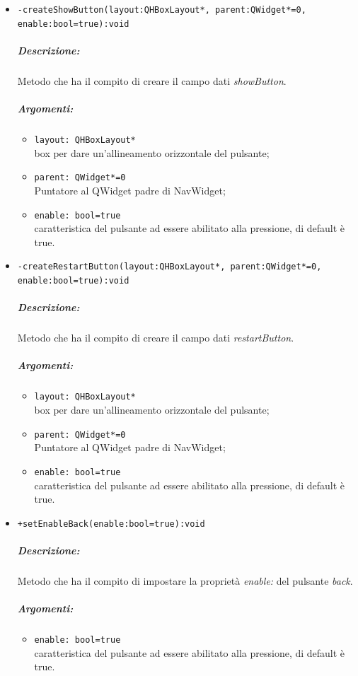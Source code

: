 \begin{itemize}
\item \color{blue}\verb!-createShowButton(layout:QHBoxLayout*, parent:QWidget*=0, enable:bool=true):void!
\color{black}
\subparagraph{Descrizione:} Metodo che ha il compito di creare il campo dati \emph{showButton}.
\subparagraph{Argomenti:}
\begin{itemize}
\item  \color{RoyalPurple} \verb!layout: QHBoxLayout*! \\ box per dare un'allineamento orizzontale del pulsante;
\item  \color{RoyalPurple} \verb!parent: QWidget*=0 ! \\ Puntatore al QWidget padre di NavWidget;
\item  \color{RoyalPurple} \verb!enable: bool=true !\\ caratteristica del pulsante ad essere abilitato alla pressione, di default è true.
\end{itemize}

\item \color{blue}\verb!-createRestartButton(layout:QHBoxLayout*, parent:QWidget*=0, enable:bool=true):void!
\color{black}
\subparagraph{Descrizione:} Metodo che ha il compito di creare il campo dati \emph{restartButton}.
\subparagraph{Argomenti:}
\begin{itemize}
\item  \color{RoyalPurple} \verb!layout: QHBoxLayout*! \\ box per dare un'allineamento orizzontale del pulsante;
\item  \color{RoyalPurple} \verb!parent: QWidget*=0 ! \\ Puntatore al QWidget padre di NavWidget;
\item  \color{RoyalPurple} \verb!enable: bool=true !\\ caratteristica del pulsante ad essere abilitato alla pressione, di default è true.
\end{itemize}

\item \color{blue}\verb!+setEnableBack(enable:bool=true):void!
\color{black}
\subparagraph{Descrizione:} Metodo che ha il compito di impostare la proprietà \textit{enable:} del pulsante \textit{back}.
\subparagraph{Argomenti:}
\begin{itemize}
\item  \color{RoyalPurple} \verb!enable: bool=true !\\ caratteristica del pulsante ad essere abilitato alla pressione, di default è true.
\end{itemize}


\end{itemize}
